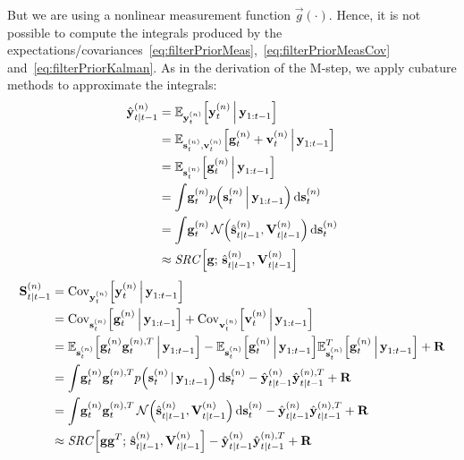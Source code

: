 			But we are using a nonlinear measurement function \( \vec{g}(\cdot) \). Hence, it is not possible to compute the integrals produced by the expectations/covariances~\eqref{eq:filterPriorMeas},~\eqref{eq:filterPriorMeasCov} and~\eqref{eq:filterPriorKalman}. As in the derivation of the M-step, we apply cubature methods to approximate the integrals:
			\begin{align}
				\hat{\boldsymbol{\mathrm{y}}}_{t \vert t - 1}^{(n)}
					&= \mathbb{E}_{\boldsymbol{\mathrm{y}}_t^{(n)}}\Big[\boldsymbol{\mathrm{y}}_t^{(n)} \,\Big\vert\, \boldsymbol{\mathrm{y}}_{1:t - 1}\Big]  \nonumber \\
					&= \mathbb{E}_{\boldsymbol{\mathrm{s}}_t^{(n)}, \boldsymbol{\mathrm{v}}_t^{(n)}}\Big[\boldsymbol{\mathrm{g}}_t^{(n)} + \boldsymbol{\mathrm{v}}_t^{(n)} \,\Big\vert\, \boldsymbol{\mathrm{y}}_{1:t - 1}\Big]  \nonumber \\
					&= \mathbb{E}_{\boldsymbol{\mathrm{s}}_t^{(n)}}\Big[\boldsymbol{\mathrm{g}}_t^{(n)} \,\Big\vert\, \boldsymbol{\mathrm{y}}_{1:t - 1}\Big]  \nonumber \\
					&= \int\! \boldsymbol{\mathrm{g}}_t^{(n)} p\Big(\boldsymbol{\mathrm{s}}_t^{(n)} \,\Big\vert\, \boldsymbol{\mathrm{y}}_{1:t - 1}\Big) \dd{\boldsymbol{\mathrm{s}}_t^{(n)}}  \nonumber \\
					&= \int\! \boldsymbol{\mathrm{g}}_t^{(n)} \,\mathcal{N}\Big(\hat{\boldsymbol{\mathrm{s}}}_{t \vert t - 1}^{(n)}, \boldsymbol{\mathrm{V}}_{t \vert t - 1}^{(n)}\Big) \dd{\boldsymbol{\mathrm{s}}_t^{(n)}}  \nonumber \\
					&\approx \mathit{SRC}\Big[ \boldsymbol{\mathrm{g}};\, \hat{\boldsymbol{\mathrm{s}}}_{t \vert t - 1}^{(n)}, \boldsymbol{\mathrm{V}}_{t \vert t - 1}^{(n)} \Big]  \label{eq:cubatureY}
			\end{align}
			\begin{align}
				\boldsymbol{\mathrm{S}}_{t \vert t - 1}^{(n)}
					&= \operatorname{Cov}_{\boldsymbol{\mathrm{y}}_t^{(n)}}\!\Big[\boldsymbol{\mathrm{y}}_t^{(n)} \,\Big\vert\, \boldsymbol{\mathrm{y}}_{1:t - 1}\Big]  \nonumber \\
					&= \operatorname{Cov}_{\boldsymbol{\mathrm{s}}_t^{(n)}}\!\Big[\boldsymbol{\mathrm{g}}_t^{(n)} \,\Big\vert\, \boldsymbol{\mathrm{y}}_{1:t - 1}\Big] + \operatorname{Cov}_{\boldsymbol{\mathrm{v}}_t^{(n)}}\!\Big[\boldsymbol{\mathrm{v}}_t^{(n)} \,\Big\vert\, \boldsymbol{\mathrm{y}}_{1:t - 1}\Big]  \nonumber \\
					&= \mathbb{E}_{\boldsymbol{\mathrm{s}}_t^{(n)}}\Big[\boldsymbol{\mathrm{g}}_t^{(n)} \boldsymbol{\mathrm{g}}_t^{(n), T} \,\Big\vert\, \boldsymbol{\mathrm{y}}_{1:t - 1}\Big] - \mathbb{E}_{\boldsymbol{\mathrm{s}}_t^{(n)}}\Big[\boldsymbol{\mathrm{g}}_t^{(n)} \,\Big\vert\, \boldsymbol{\mathrm{y}}_{1:t - 1}\Big] \mathbb{E}_{\boldsymbol{\mathrm{s}}_t^{(n)}}^T\Big[\boldsymbol{\mathrm{g}}_t^{(n)} \,\Big\vert\, \boldsymbol{\mathrm{y}}_{1:t - 1}\Big] + \boldsymbol{\mathrm{R}}  \nonumber \\
					&= \int\! \boldsymbol{\mathrm{g}}_t^{(n)} \boldsymbol{\mathrm{g}}_t^{(n), T} p\Big(\boldsymbol{\mathrm{s}}_t^{(n)} \,\vert\, \boldsymbol{\mathrm{y}}_{1:t - 1}\Big) \dd{\boldsymbol{\mathrm{s}}_t^{(n)}} - \hat{\boldsymbol{\mathrm{y}}}_{t \vert t - 1}^{(n)} \hat{\boldsymbol{\mathrm{y}}}_{t \vert t - 1}^{(n), T} + \boldsymbol{\mathrm{R}}  \nonumber \\
					&= \int\! \boldsymbol{\mathrm{g}}_t^{(n)} \boldsymbol{\mathrm{g}}_t^{(n), T} \,\mathcal{N}\Big(\hat{\boldsymbol{\mathrm{s}}}_{t \vert t - 1}^{(n)}, \boldsymbol{\mathrm{V}}_{t \vert t - 1}^{(n)}\Big) \dd{\boldsymbol{\mathrm{s}}_t^{(n)}} - \hat{\boldsymbol{\mathrm{y}}}_{t \vert t - 1}^{(n)} \hat{\boldsymbol{\mathrm{y}}}_{t \vert t - 1}^{(n), T} + \boldsymbol{\mathrm{R}}  \nonumber \\
					&\approx \mathit{SRC}\Big[ \boldsymbol{\mathrm{g}} \boldsymbol{\mathrm{g}}^T;\, \hat{\boldsymbol{\mathrm{s}}}_{t \vert t - 1}^{(n)}, \boldsymbol{\mathrm{V}}_{t \vert t - 1}^{(n)} \Big] - \hat{\boldsymbol{\mathrm{y}}}_{t \vert t - 1}^{(n)} \hat{\boldsymbol{\mathrm{y}}}_{t \vert t - 1}^{(n), T} + \boldsymbol{\mathrm{R}}  \label{eq:cubatureS}
			\end{align}

